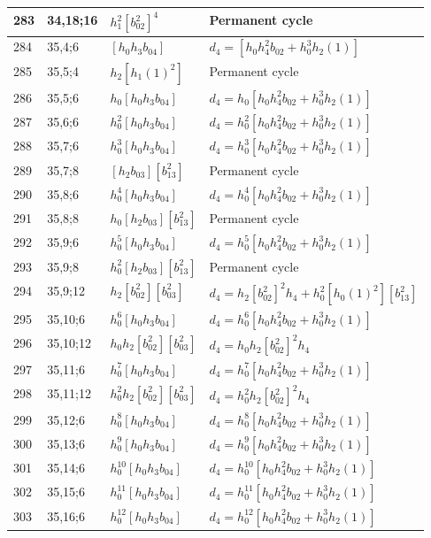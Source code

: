 \documentclass{article}
\begin{document}
\begin{longtable}{|l|l|>{\raggedright\arraybackslash}p{6cm}|>{\raggedright\arraybackslash}p{6cm}|}
\hline
283 & 34,18;16 & $h_1^2[b_{02}^2]^4$ & Permanent cycle\\
\hline
284 & 35,4;6 & $[h_0h_3b_{04}]$ &$d_{4}=[h_0h_4^2b_{02} + h_0^3h_2(1)]$\\
\hline
285 & 35,5;4 & $h_2[h_1(1)^2]$ & Permanent cycle\\
\hline
286 & 35,5;6 & $h_0[h_0h_3b_{04}]$ &$d_{4}=h_0[h_0h_4^2b_{02} + h_0^3h_2(1)]$\\
\hline
287 & 35,6;6 & $h_0^2[h_0h_3b_{04}]$ &$d_{4}=h_0^2[h_0h_4^2b_{02} + h_0^3h_2(1)]$\\
\hline
288 & 35,7;6 & $h_0^3[h_0h_3b_{04}]$ &$d_{4}=h_0^3[h_0h_4^2b_{02} + h_0^3h_2(1)]$\\
\hline
289 & 35,7;8 & $[h_2b_{03}][b_{13}^2]$ & Permanent cycle\\
\hline
290 & 35,8;6 & $h_0^4[h_0h_3b_{04}]$ &$d_{4}=h_0^4[h_0h_4^2b_{02} + h_0^3h_2(1)]$\\
\hline
291 & 35,8;8 & $h_0[h_2b_{03}][b_{13}^2]$ & Permanent cycle\\
\hline
292 & 35,9;6 & $h_0^5[h_0h_3b_{04}]$ &$d_{4}=h_0^5[h_0h_4^2b_{02} + h_0^3h_2(1)]$\\
\hline
293 & 35,9;8 & $h_0^2[h_2b_{03}][b_{13}^2]$ & Permanent cycle\\
\hline
294 & 35,9;12 & $h_2[b_{02}^2][b_{03}^2]$ &$d_{4}=h_2[b_{02}^2]^2h_4 + h_0^2[h_0(1)^2][b_{13}^2]$\\
\hline
295 & 35,10;6 & $h_0^6[h_0h_3b_{04}]$ &$d_{4}=h_0^6[h_0h_4^2b_{02} + h_0^3h_2(1)]$\\
\hline
296 & 35,10;12 & $h_0h_2[b_{02}^2][b_{03}^2]$ &$d_{4}=h_0h_2[b_{02}^2]^2h_4$\\
\hline
297 & 35,11;6 & $h_0^7[h_0h_3b_{04}]$ &$d_{4}=h_0^7[h_0h_4^2b_{02} + h_0^3h_2(1)]$\\
\hline
298 & 35,11;12 & $h_0^2h_2[b_{02}^2][b_{03}^2]$ &$d_{4}=h_0^2h_2[b_{02}^2]^2h_4$\\
\hline
299 & 35,12;6 & $h_0^8[h_0h_3b_{04}]$ &$d_{4}=h_0^8[h_0h_4^2b_{02} + h_0^3h_2(1)]$\\
\hline
300 & 35,13;6 & $h_0^9[h_0h_3b_{04}]$ &$d_{4}=h_0^9[h_0h_4^2b_{02} + h_0^3h_2(1)]$\\
\hline
301 & 35,14;6 & $h_0^{10}[h_0h_3b_{04}]$ &$d_{4}=h_0^{10}[h_0h_4^2b_{02} + h_0^3h_2(1)]$\\
\hline
302 & 35,15;6 & $h_0^{11}[h_0h_3b_{04}]$ &$d_{4}=h_0^{11}[h_0h_4^2b_{02} + h_0^3h_2(1)]$\\
\hline
303 & 35,16;6 & $h_0^{12}[h_0h_3b_{04}]$ &$d_{4}=h_0^{12}[h_0h_4^2b_{02} + h_0^3h_2(1)]$\\

\end{longtable}
\end{document}
